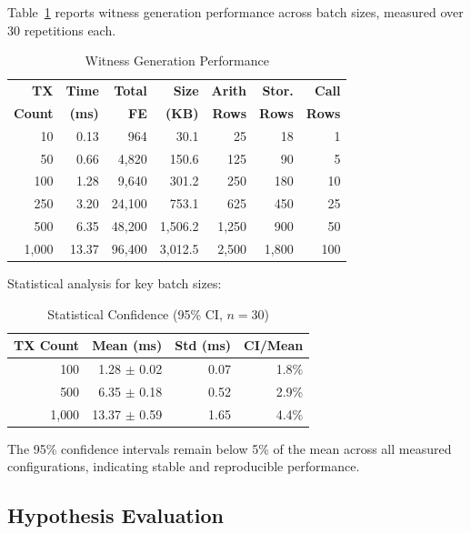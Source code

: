 \documentclass[conference]{IEEEtran}
\begin{document}
Table~\ref{tab:benchmarks} reports witness generation performance across
batch sizes, measured over 30 repetitions each.

\begin{table}[htbp]
\caption{Witness Generation Performance}
\label{tab:benchmarks}
\centering
\begin{tabular}{rrrrrrr}
\toprule
\textbf{TX} & \textbf{Time} & \textbf{Total} & \textbf{Size} & \textbf{Arith} & \textbf{Stor.} & \textbf{Call} \\
\textbf{Count} & \textbf{(ms)} & \textbf{FE} & \textbf{(KB)} & \textbf{Rows} & \textbf{Rows} & \textbf{Rows} \\
\midrule
10    & 0.13  & 964     & 30.1    & 25    & 18    & 1   \\
50    & 0.66  & 4{,}820   & 150.6   & 125   & 90    & 5   \\
100   & 1.28  & 9{,}640   & 301.2   & 250   & 180   & 10  \\
250   & 3.20  & 24{,}100  & 753.1   & 625   & 450   & 25  \\
500   & 6.35  & 48{,}200  & 1{,}506.2 & 1{,}250 & 900   & 50  \\
1{,}000 & 13.37 & 96{,}400  & 3{,}012.5 & 2{,}500 & 1{,}800 & 100 \\
\bottomrule
\end{tabular}
\end{table}

Statistical analysis for key batch sizes:

\begin{table}[htbp]
\caption{Statistical Confidence (95\% CI, $n=30$)}
\label{tab:confidence}
\centering
\begin{tabular}{rrrr}
\toprule
\textbf{TX Count} & \textbf{Mean (ms)} & \textbf{Std (ms)} & \textbf{CI/Mean} \\
\midrule
100   & 1.28 $\pm$ 0.02  & 0.07 & 1.8\% \\
500   & 6.35 $\pm$ 0.18  & 0.52 & 2.9\% \\
1{,}000 & 13.37 $\pm$ 0.59 & 1.65 & 4.4\% \\
\bottomrule
\end{tabular}
\end{table}

The 95\% confidence intervals remain below 5\% of the mean across all
measured configurations, indicating stable and reproducible performance.

\subsection{Hypothesis Evaluation}
\end{document}
